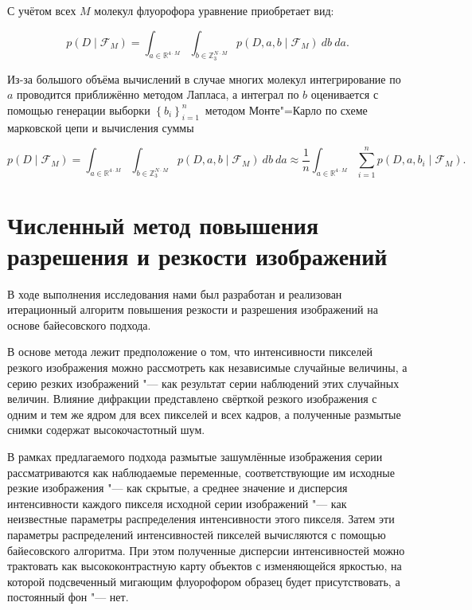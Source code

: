 С учётом всех $M$ молекул флуорофора уравнение приобретает вид:

\begin{equation*}
	p\left(D\middle|\mathcal{F}_M\right)=\int_{a\in\mathbb{R}^{4 \cdot M}}\int_{b\in\mathbb{Z}_3^{N \cdot M}}{p\left(D,a,b\middle|\mathcal{F}_M\right)\ db\ da}.
\end{equation*}	

Из-за большого объёма вычислений в случае многих молекул интегрирование по $a$ проводится приближённо методом Лапласа, а интеграл по $b$ оценивается с помощью генерации выборки $\left\{b_i\right\}_{i=1\ }^n$ методом Монте"=Карло по схеме марковской цепи и вычисления суммы

\begin{equation*}
	p\left(D\middle|\mathcal{F}_M\right)=\int_{a\in\mathbb{R}^{4 \cdot M}}\int_{b\in\mathbb{Z}_3^{N \cdot M}}{p\left(D,a,b\middle|\mathcal{F}_M\right)\ db\ da} \approx \frac{1}{n}\int_{a\in\mathbb{R}^{4 \cdot M}}{\sum_{i=1}^{n}{p\left(D,a,b_i\middle|\mathcal{F}_M\right)}}.
\end{equation*}

\section{Численный метод повышения разрешения и резкости изображений}

В ходе выполнения исследования нами был разработан и реализован итерационный алгоритм повышения резкости и разрешения изображений на основе байесовского подхода.

В основе метода лежит предположение о том, что интенсивности пикселей резкого изображения можно рассмотреть как независимые случайные величины, а серию резких изображений "--- как результат серии наблюдений этих случайных величин. Влияние дифракции представлено свёрткой резкого изображения с одним и тем же ядром для всех пикселей и всех кадров, а полученные размытые снимки содержат высокочастотный шум.

В рамках предлагаемого подхода размытые зашумлённые изображения серии рассматриваются как наблюдаемые переменные, соответствующие им исходные резкие изображения "--- как скрытые, а среднее значение и дисперсия интенсивности каждого пикселя исходной серии изображений "--- как неизвестные параметры распределения интенсивности этого пикселя. Затем эти параметры распределений интенсивностей пикселей вычисляются с помощью байесовского алгоритма. При этом полученные дисперсии интенсивностей можно трактовать как высококонтрастную карту объектов с изменяющейся яркостью, на которой подсвеченный мигающим флуорофором образец будет присутствовать, а постоянный фон "--- нет.

